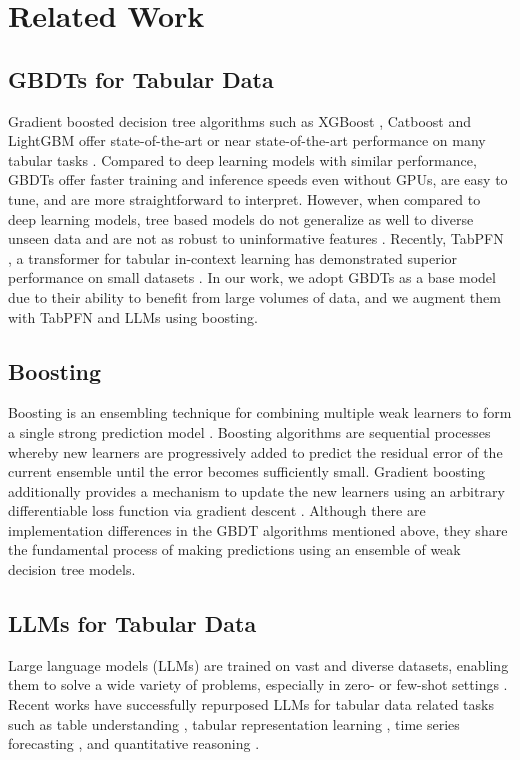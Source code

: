 \section{Related Work}
\label{related_work}

\subsection{GBDTs for Tabular Data}
Gradient boosted decision tree algorithms such as XGBoost \citep{chen2016xgboost}, Catboost \citep{prokhorenkova2018catboost} and LightGBM \citep{ke2017lightgbm} offer state-of-the-art or near state-of-the-art performance on many tabular tasks \citep{grinsztajn2022why}. Compared to deep learning models with similar performance, GBDTs offer faster training and inference speeds even without GPUs, are easy to tune, and are more straightforward to interpret. However, when compared to deep learning models, tree based models do not generalize as well to diverse unseen data and are not as robust to uninformative features \citep{grinsztajn2022why}.  Recently, TabPFN \citep{hollmann2023tabpfn}, a transformer for tabular in-context learning has demonstrated superior performance on small datasets \citep{mcelfresh2024neural}.  In our work, we adopt GBDTs as a base model due to their ability to benefit from large volumes of data, and we augment them with TabPFN and LLMs using boosting.

\subsection{Boosting}
Boosting is an ensembling technique for combining multiple weak learners to form a single strong prediction model \citep{freund1997decision}. Boosting algorithms are sequential processes whereby new learners are progressively added to predict the residual error of the current ensemble until the error becomes sufficiently small. Gradient boosting additionally provides a mechanism to update the new learners using an arbitrary differentiable loss function via gradient descent \citep{10.1214/aos/1013203451}. Although there are implementation differences in the GBDT algorithms mentioned above, they share the fundamental process of making predictions using an ensemble of weak decision tree models.

\subsection{LLMs for Tabular Data}
Large language models (LLMs) are trained on vast and diverse datasets, enabling them to solve a wide variety of problems, especially in zero- or few-shot settings \citep{hegselmann2023tabllm}. Recent works have successfully repurposed LLMs for tabular data related tasks such as table understanding \citep{fewshotreason}, tabular representation learning \citep{iida-etal-2021-tabbie, NEURIPS2023_hytrel}, time series forecasting \citep{gruver2023large}, and quantitative reasoning \citep{tap4llmsui}.

